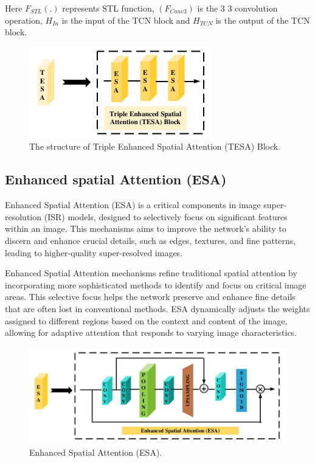 \documentclass{ieeeaccess}
\begin{document}
Here ${F_{STL}}$$(.)$ represents STL function, $({F_{Conv3}})$ is the 3 3 convolution operation, ${H_{In}}$ is the input of the TCN block and ${H_{TCN}}$ is the output of the TCN block.


\begin{figure}[ht]
  \includegraphics[width=\linewidth]{4FIGURE.pdf}
  \caption{The structure of Triple Enhanced Spatial Attention (TESA) Block.}
  \label{fig:4}
\end{figure}

\subsection{Enhanced spatial Attention (ESA)}

Enhanced Spatial Attention (ESA) is a critical components in image super-resolution (ISR) models, designed to selectively focus on significant features within an image. This mechanisms aims to improve the network’s ability to discern and enhance crucial details, such as edges, textures, and fine patterns, leading to higher-quality super-resolved images.

Enhanced Spatial Attention mechanisms refine traditional spatial attention by incorporating more sophisticated methods to identify and focus on critical image areas. This selective focus helps the network preserve and enhance fine details that are often lost in conventional methods. ESA dynamically adjusts the weights assigned to different regions based on the context and content of the image, allowing for adaptive attention that responds to varying image characteristics.

\begin{figure}[ht]
  \includegraphics[width=\linewidth]{5FIGURE.pdf}
  \caption{Enhanced Spatial Attention (ESA).}
  \label{fig:4}
\end{figure}
\end{document}
